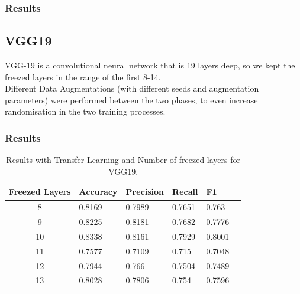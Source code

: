 \documentclass[10pt]{article}
\begin{document}
\subsubsection{Results}
\subsection{VGG19}
VGG-19 is a convolutional neural network that is 19 layers deep, so we kept the freezed layers in the range of the first 8-14.\\
Different Data Augmentations (with different seeds and augmentation parameters) were performed between the two phases,
to even increase randomisation in the two training processes.
\subsubsection{Results}
\begin{table}[ht]
\centering
\begin{adjustbox}{width=240}
\small
\begin{tabular}{|c|l|l|l|l|l}

\hline \bf Freezed Layers & \bf Accuracy & \bf Precision & \bf Recall & \bf F1 \\ \hline
8 & 0.8169 & 0.7989 & 0.7651 & 0.763\\
9 & 0.8225 & 0.8181 & 0.7682 & 0.7776\\
10 & 0.8338 & 0.8161 & 0.7929 & 0.8001\\
11 & 0.7577 & 0.7109 & 0.715 & 0.7048\\
12 & 0.7944 & 0.766 & 0.7504 & 0.7489\\
13 & 0.8028 & 0.7806 & 0.754 & 0.7596\\
\hline
\end{tabular}
\end{adjustbox}
\caption{Results with Transfer Learning and Number of freezed layers for VGG19.}
\end{table}
\end{document}
